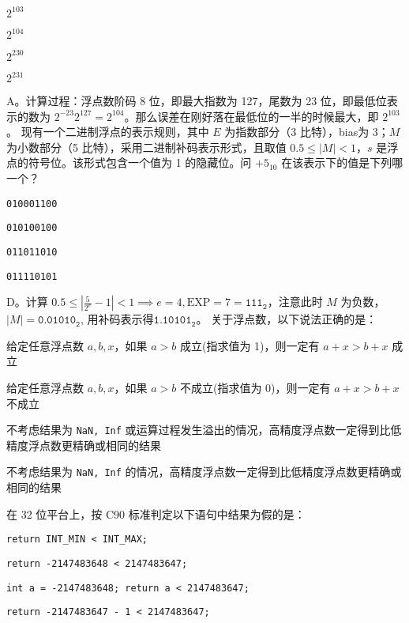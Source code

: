 \begin{problems}
		\begin{choices}
			\item $2^{103}$
			\item $2^{104}$
			\item $2^{230}$
			\item $2^{231}$
		\end{choices}
		\sol A。计算过程：浮点数阶码 8 位，即最大指数为 127，尾数为 23 位，即最低位表示的数为 $2^{-23}2^{127}=2^{104}$。那么误差在刚好落在最低位的一半的时候最大，即 $2^{103}$。
		 现有一个二进制浮点的表示规则，其中 $E$ 为指数部分（3 比特），bias为 3；$M$ 为小数部分（5 比特），采用二进制补码表示形式，且取值 $0.5 \leq |M|<1$，$s$ 是浮点的符号位。该形式包含一个值为 1 的隐藏位。问 $+5_{10}$ 在该表示下的值是下列哪一个？
		\begin{choices}
			\item \texttt{010001100}
			\item \texttt{010100100}
			\item \texttt{011011010}
			\item \texttt{011110101}
		\end{choices}
		\sol D。计算 $0.5 \leq \left|\frac{5}{2^e}-1 \right|<1 \implies e=4, \text{EXP}=7 = \texttt{111}_\texttt{2}$，注意此时 $M$ 为负数，$|M|=\texttt{0.01010}_\texttt{2}$, 用补码表示得$\texttt{1.10101}_\texttt{2}$。
		 关于浮点数，以下说法正确的是：
		\begin{choices}
			\item 给定任意浮点数 $a, b, x$，如果 $a>b$ 成立(指求值为 1)，则一定有 $a+x>b+x$ 成立
			\item 给定任意浮点数 $a, b, x$，如果 $a>b$ 不成立(指求值为 0)，则一定有 $a+x>b+x$ 不成立
			\item 不考虑结果为 \texttt{NaN, Inf} 或运算过程发生溢出的情况，高精度浮点数一定得到比低精度浮点数更精确或相同的结果
			\item 不考虑结果为 \texttt{NaN, Inf} 的情况，高精度浮点数一定得到比低精度浮点数更精确或相同的结果
		\end{choices}
		 在 32 位平台上，按 C90 标准判定以下语句中结果为假的是：
		\begin{choices}
			\item \verb|return INT_MIN < INT_MAX;|
			\item \verb|return -2147483648 < 2147483647;|
			\item \verb|int a = -2147483648; return a < 2147483647;|
			\item \verb|return -2147483647 - 1 < 2147483647;|
		\end{choices}

\end{problems}
